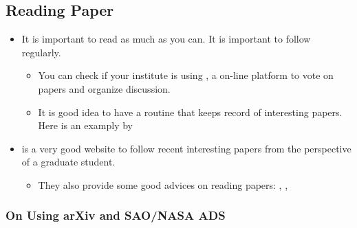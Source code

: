 \documentclass[letterpaper,10pt,english]{sphinxmanual}
\begin{document}
\subsection{Reading Paper}
\label{\detokenize{resource/research/getting_started:reading-paper}}\begin{itemize}
\item {} 
It is important to read as much as you can. It is important to follow
 regularly.
\begin{itemize}
\item {} 
You can check if your institute is using
, a on-line platform to
vote on papers and organize  discussion.

\item {} 
It is good idea to have a routine that keeps record of interesting
papers. Here is an examply by

\end{itemize}

\item {} 
 is a very good website to
follow recent interesting papers from the perspective of a graduate
student.
\begin{itemize}
\item {} 
They also provide some good advices on reading papers: ,
,

\end{itemize}

\end{itemize}


\subsubsection{On Using arXiv and SAO/NASA ADS}
\label{\detokenize{resource/research/getting_started:on-using-arxiv-and-sao-nasa-ads}}
\end{document}
